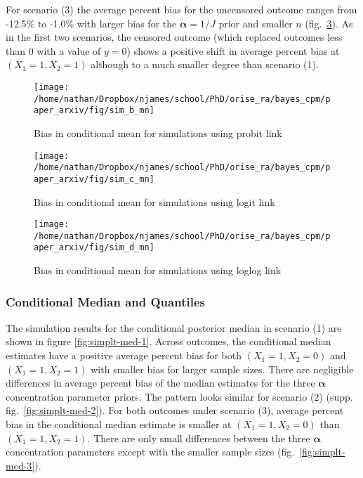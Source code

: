 \documentclass[
]{article}
\begin{document}
For scenario (3) the average percent bias for the uncensored outcome ranges from -12.5\% to -1.0\% with larger bias for the \(\boldsymbol{\alpha}=1/J\) prior and smaller \(n\) (fig.~\ref{fig:simplt-mn-3}). As in the first two scenarios, the censored outcome (which replaced outcomes less than 0 with a value of \(y=0\)) shows a positive shift in average percent bias at \((X_1=1,X_2=1)\) although to a much smaller degree than scenario (1).

\begin{figure}

{\centering \texttt{[image: /home/nathan/Dropbox/njames/school/PhD/orise\_ra/bayes\_cpm/paper\_arxiv/fig/sim\_b\_mn]} 

}

\caption{Bias in conditional mean for simulations using probit link}\label{fig:simplt-mn-1}
\end{figure}

\begin{figure}

{\centering \texttt{[image: /home/nathan/Dropbox/njames/school/PhD/orise\_ra/bayes\_cpm/paper\_arxiv/fig/sim\_c\_mn]} 

}

\caption{Bias in conditional mean for simulations using logit link}\label{fig:simplt-mn-2}
\end{figure}

\begin{figure}

{\centering \texttt{[image: /home/nathan/Dropbox/njames/school/PhD/orise\_ra/bayes\_cpm/paper\_arxiv/fig/sim\_d\_mn]} 

}

\caption{Bias in conditional mean for simulations using loglog link}\label{fig:simplt-mn-3}
\end{figure}

\hypertarget{conditional-median-and-quantiles}{%
\subsubsection{Conditional Median and Quantiles}\label{conditional-median-and-quantiles}}

The simulation results for the conditional posterior median in scenario (1) are shown in figure \ref{fig:simplt-med-1}. Across outcomes, the conditional median estimates have a positive average percent bias for both \((X_1=1,X_2=0)\) and \((X_1=1,X_2=1)\) with smaller bias for larger sample sizes. There are negligible differences in average percent bias of the median estimates for the three \(\boldsymbol{\alpha}\) concentration parameter priors. The pattern looks similar for scenario (2) (supp. fig.~\ref{fig:simplt-med-2}). For both outcomes under scenario (3), average percent bias in the conditional median estimate is smaller at \((X_1=1,X_2=0)\) than \((X_1=1,X_2=1)\). There are only small differences between the three \(\boldsymbol{\alpha}\) concentration parameters except with the smaller sample sizes (fig.~\ref{fig:simplt-med-3}).
\end{document}
